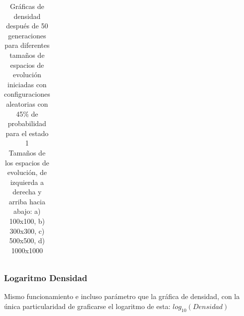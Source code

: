 \documentclass[]{article}
\begin{document}
\begin{table}[!h]
\begin{tabular}{c c}
				\end{tabular}
				\caption{Gráficas de densidad después de 50 generaciones para diferentes tamaños de espacios de evolución iniciadas con configuraciones aleatorias con 45\% de probabilidad para el estado 1\\ Tamaños de los espacios de evolución, de izquierda a derecha y arriba hacia abajo: a) 100x100, b) 300x300, c) 500x500, d) 1000x1000}
			\end{table}
		
		\newpage
		\subsubsection{Logaritmo Densidad}
			Mismo funcionamiento e incluso parámetro que la gráfica de densidad, con la única particularidad de graficarse el logaritmo de esta: $log_{10}(Densidad)$
			
\end{document}
